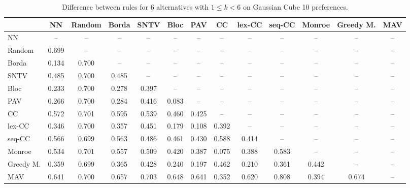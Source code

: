 
\begin{table*}[htbp]
\centering
\begin{tabular}{lcccccccccccc}
\toprule
 & NN & Random & Borda & SNTV & Bloc & PAV & CC & lex-CC & seq-CC & Monroe & Greedy M. & MAV \\
\midrule
NN & -- & -- & -- & -- & -- & -- & -- & -- & -- & -- & -- & -- \\
Random & \cellcolor{blue!69} 0.699 & -- & -- & -- & -- & -- & -- & -- & -- & -- & -- & -- \\
Borda & \cellcolor{blue!13} 0.134 & \cellcolor{blue!70} 0.700 & -- & -- & -- & -- & -- & -- & -- & -- & -- & -- \\
SNTV & \cellcolor{blue!48} 0.485 & \cellcolor{blue!70} 0.700 & \cellcolor{blue!48} 0.485 & -- & -- & -- & -- & -- & -- & -- & -- & -- \\
Bloc & \cellcolor{blue!23} 0.233 & \cellcolor{blue!70} 0.700 & \cellcolor{blue!27} 0.278 & \cellcolor{blue!39} 0.397 & -- & -- & -- & -- & -- & -- & -- & -- \\
PAV & \cellcolor{blue!26} 0.266 & \cellcolor{blue!70} 0.700 & \cellcolor{blue!28} 0.284 & \cellcolor{blue!41} 0.416 & \cellcolor{blue!8} 0.083 & -- & -- & -- & -- & -- & -- & -- \\
CC & \cellcolor{blue!57} 0.572 & \cellcolor{blue!70} 0.701 & \cellcolor{blue!59} 0.595 & \cellcolor{blue!53} 0.539 & \cellcolor{blue!46} 0.460 & \cellcolor{blue!42} 0.425 & -- & -- & -- & -- & -- & -- \\
lex-CC & \cellcolor{blue!34} 0.346 & \cellcolor{blue!70} 0.700 & \cellcolor{blue!35} 0.357 & \cellcolor{blue!45} 0.451 & \cellcolor{blue!17} 0.179 & \cellcolor{blue!10} 0.108 & \cellcolor{blue!39} 0.392 & -- & -- & -- & -- & -- \\
seq-CC & \cellcolor{blue!56} 0.566 & \cellcolor{blue!69} 0.699 & \cellcolor{blue!56} 0.563 & \cellcolor{blue!48} 0.486 & \cellcolor{blue!46} 0.461 & \cellcolor{blue!43} 0.430 & \cellcolor{blue!58} 0.588 & \cellcolor{blue!41} 0.414 & -- & -- & -- & -- \\
Monroe & \cellcolor{blue!53} 0.534 & \cellcolor{blue!70} 0.701 & \cellcolor{blue!55} 0.557 & \cellcolor{blue!50} 0.509 & \cellcolor{blue!42} 0.420 & \cellcolor{blue!38} 0.387 & \cellcolor{blue!7} 0.075 & \cellcolor{blue!38} 0.388 & \cellcolor{blue!58} 0.583 & -- & -- & -- \\
Greedy M. & \cellcolor{blue!35} 0.359 & \cellcolor{blue!69} 0.699 & \cellcolor{blue!36} 0.365 & \cellcolor{blue!42} 0.428 & \cellcolor{blue!24} 0.240 & \cellcolor{blue!19} 0.197 & \cellcolor{blue!46} 0.462 & \cellcolor{blue!21} 0.210 & \cellcolor{blue!36} 0.361 & \cellcolor{blue!44} 0.442 & -- & -- \\
MAV & \cellcolor{blue!64} 0.641 & \cellcolor{blue!70} 0.700 & \cellcolor{blue!65} 0.657 & \cellcolor{blue!70} 0.703 & \cellcolor{blue!64} 0.648 & \cellcolor{blue!64} 0.641 & \cellcolor{blue!35} 0.352 & \cellcolor{blue!62} 0.620 & \cellcolor{blue!80} 0.808 & \cellcolor{blue!39} 0.394 & \cellcolor{blue!67} 0.674 & -- \\
\bottomrule
\end{tabular}

\caption{Difference between rules for 6 alternatives with $1 \leq k < 6$ on Gaussian Cube 10 preferences.}
\label{tab:rule_distance_heatmap-m=[6]-pref_dist=euclidean__args__dimensions=10_-_space=gaussian_cube}
\end{table*}
    